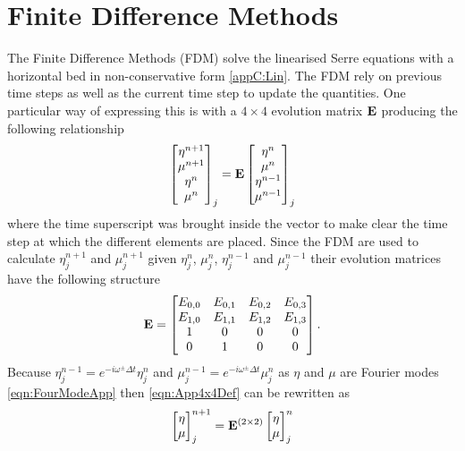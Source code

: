 \section{Finite Difference Methods}
The Finite Difference Methods (FDM) solve the linearised Serre equations with a horizontal bed in non-conservative form \eqref{appC:Lin}. The FDM rely on previous time steps as well as the current time step to update the quantities. One particular way of expressing this is with a $4\times4$ evolution matrix $\mathbf{E}$ producing the following relationship
\begin{equation}
\label{eqn:App4x4Def}
\begin{bmatrix}
{\eta}^{n+1} \\{\mu}^{n+1} \\ {\eta}^{n} \\{\mu}^{n} 
\end{bmatrix}_j = \mathbf{E} \begin{bmatrix}{\eta}^{n} \\{\mu}^{n} \\ {\eta}^{n-1} \\{\mu}^{n-1} 
\end{bmatrix}_j
\end{equation} 
where the time superscript was brought inside the vector to make clear the time step at which the different elements are placed. Since the FDM are used to calculate ${\eta}^{n+1}_j$ and $\mu^{n+1}_j$ given ${\eta}^{n}_j$, $\mu^{n}_j$, ${\eta}^{n-1}_j$ and $\mu^{n-1}_j$ their evolution matrices have the following structure
\begin{equation}
\label{eqn:App4x4}
\mathbf{E} = \begin{bmatrix}E_{0,0} & E_{0,1} & E_{0,2} & E_{0,3}\\
E_{1,0} & E_{1,1} & E_{1,2} & E_{1,3}\\
1 & 0 & 0 & 0\\
0 & 1 & 0 & 0\\
\end{bmatrix}.
\end{equation}
Because ${\eta}^{n-1}_j = e^{-i \omega^\pm \Delta t}{\eta}^{n}_j $ and ${\mu}^{n-1}_j = e^{-i \omega^\pm \Delta t}{\mu}^{n}_j$ as $\eta$ and $\mu$ are Fourier modes \eqref{eqn:FourModeApp} then \eqref{eqn:App4x4Def} can be rewritten as
\begin{equation}
\begin{bmatrix}
{\eta} \\{\mu}
\end{bmatrix}^{n+1} _j = \mathbf{E}^{\left(2 \times 2\right)} \begin{bmatrix}{\eta} \\{\mu}
\end{bmatrix}^{n}_j
\label{eqn:APPCE22}
\end{equation}  
